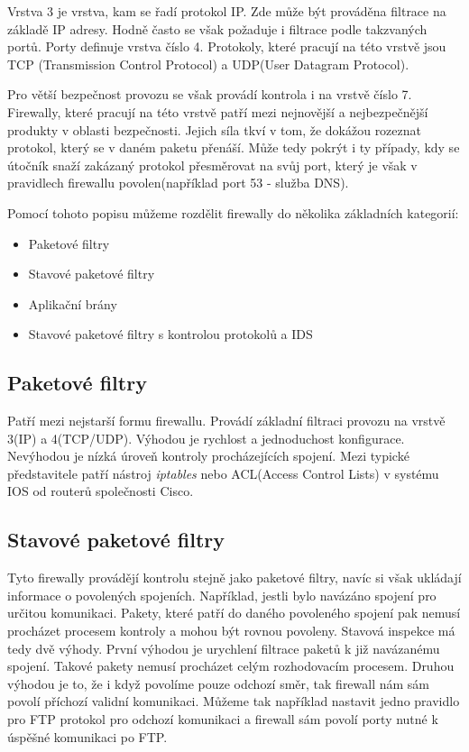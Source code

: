 \documentclass[11pt,a4paper]{article}
\begin{document}
Vrstva 3 je vrstva, kam se řadí protokol IP. Zde může být prováděna filtrace na základě IP adresy. Hodně často se však požaduje i filtrace podle takzvaných portů. Porty definuje vrstva číslo 4. Protokoly, které pracují na této vrstvě jsou TCP (Transmission Control Protocol) a UDP(User Datagram Protocol). 

Pro větší bezpečnost provozu se však provádí kontrola i na vrstvě číslo 7. Firewally, které pracují na této vrstvě patří mezi nejnovější a nejbezpečnější produkty v oblasti bezpečnosti. Jejich síla tkví v tom, že dokážou rozeznat protokol, který se v daném paketu přenáší. Může tedy pokrýt i ty případy, kdy se útočník snaží zakázaný protokol přesměrovat na svůj port, který je však v pravidlech firewallu povolen(například port 53 - služba DNS).

Pomocí tohoto popisu můžeme rozdělit firewally do několika základních kategorií:
\begin{itemize}
	\item Paketové filtry
	\item Stavové paketové filtry
	\item Aplikační brány
	\item Stavové paketové filtry s kontrolou protokolů a IDS
\end{itemize} 

\subsection{Paketové filtry}
Patří mezi nejstarší formu firewallu. Provádí základní filtraci provozu na vrstvě 3(IP) a 4(TCP/UDP). Výhodou je rychlost a jednoduchost konfigurace. Nevýhodou je nízká úroveň kontroly procházejících spojení. Mezi typické představitele patří nástroj \textit{iptables} nebo ACL(Access Control Lists) v systému IOS od routerů společnosti Cisco.

\subsection{Stavové paketové filtry}
Tyto firewally provádějí kontrolu stejně jako paketové filtry, navíc si však ukládají informace o povolených spojeních. Například, jestli bylo navázáno spojení pro určitou komunikaci. Pakety, které patří do daného povoleného spojení pak nemusí procházet procesem kontroly a mohou být rovnou povoleny. Stavová inspekce má tedy dvě výhody. První výhodou je urychlení filtrace paketů k již navázanému spojení. Takové pakety nemusí procházet celým rozhodovacím procesem. Druhou výhodou je to, že i když povolíme pouze odchozí směr, tak firewall nám sám povolí příchozí validní komunikaci. Můžeme tak například nastavit jedno pravidlo pro FTP protokol pro odchozí komunikaci a firewall sám povolí porty nutné k úspěšné komunikaci po FTP.
\end{document}
